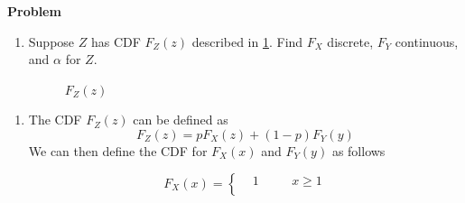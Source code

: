 \documentclass[12pt]{article}
\newenvironment{Ex}{\textbf{Problem}\vspace{.75em}\\}{}
\begin{document}
\begin{enumerate}
\begin{Ex}
\begin{enumerate}
    \item Suppose $Z$ has CDF $F_Z(z)$ described in
      \cref{fig:6-fig}. Find $F_X$ discrete, $F_Y$ continuous, and
      $\alpha$ for $Z$.
      \begin{figure}[ht]
        \centering
        \caption{$F_Z(z)$}
        \label{fig:6-fig}
      \end{figure}
    \end{enumerate}
    \pagebreak[4]
    \begin{solution} \hfill
      \begin{enumerate}
      \item The CDF $F_Z(z)$ can be defined as
        \begin{equation}
          \label{eq:6-fz}
          F_Z(z) = pF_X(z) + (1-p)F_Y(y)
        \end{equation}
        We can then define the CDF for $F_{X}(x)$ and $F_{Y}(y)$ as
        follows
        \begin{multicols}{2}
          \begin{equation}
            \label{eq:6a-cdf-fx}
            F_{X}(x) = \left\{
              \begin{aligned}
                & 1 &&\quad x\ge1 \\

\end{aligned}
\end{equation}
\end{multicols}
\end{enumerate}
\end{solution}
\end{Ex}
\end{enumerate}
\end{document}
